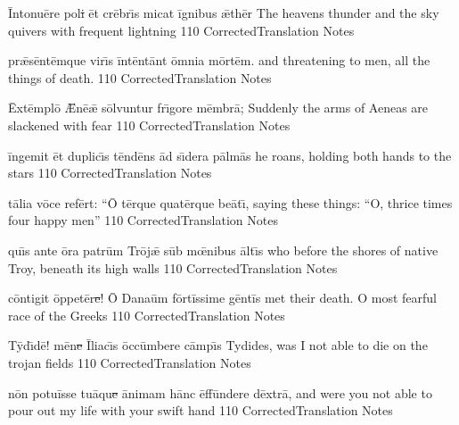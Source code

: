 \documentclass[]{book}
\begin{document}
	\latline
	  {\=Int\-on\-u\={\macron e}r\-e p\-ol\sout{i }\=et cr\={\macron e}br\={\macron \i}s m\-ic\-at \=ign\-ib\-us \={\ae}th\={\macron e}r}
	  { The heavens thunder and the sky quivers with frequent lightning }
	  {110}
	  { CorrectedTranslation }
	  { Notes }


	\latline
	  {pr\={\ae}s\=ent\=emqu\-e v\-ir\={\macron \i}s \=int\=ent\=ant \=omn\-i\-a m\=ort\=em.}
	  { and threatening to men, all the things of death. }
	  {110}
	  { CorrectedTranslation }
	  { Notes }


	\newpage

	\latline
	  {\=Ext\=empl\={\macron o} \={\AE}n\={\macron e}\={\ae} s\=olv\-unt\-ur fr\={\macron \i}g\-or\-e m\=embr\=a;}
	  { Suddenly the arms of Aeneas are slackened with fear }
	  {110}
	  { CorrectedTranslation }
	  { Notes }


	\latline
	  {\=ing\-em\-it \=et d\-upl\-ic\={\macron \i}s t\=end\={\macron e}ns \=ad s\={\macron \i}d\-er\-a p\=alm\={\macron a}s}
	  { he roans, holding both hands to the stars }
	  {110}
	  { CorrectedTranslation }
	  { Notes }


	\latline
	  {t\={\macron a}l\-i\-a v\={\macron o}c\-e r\-ef\=ert:  ``\={\macron O} t\=erqu\-e \-quat\=erqu\-e b\-e\={\macron a}t\={\macron \i},}
	  { saying these things:  ``O, thrice times four happy men'' }
	  {110}
	  { CorrectedTranslation }
	  { Notes }


	\newpage

	\latline
	  {qu\={\macron \i}s \-ant\-e \={\macron o}r\-a p\-atr\=um Tr\=oj\={\ae} s\=ub m\={\oe}n\-ib\-us \=alt\={\macron \i}s}
	  { who before the shores of native Troy, beneath its high walls }
	  {110}
	  { CorrectedTranslation }
	  { Notes }


	\latline
	  {c\=ont\-ig\-it \=opp\-et\=er\sout{e}!  \={\macron O} D\-an\-a\=um f\=ort\=iss\-im\-e g\=ent\=is}
	  { met their death.  O most fearful race of the Greeks }
	  {110}
	  { CorrectedTranslation }
	  { Notes }


	\latline
	  {T\={\macron y}d\={\macron \i}d\={\macron e}!  m\={\macron e}n\sout{e }\={\macron I}l\-i\-ac\={\macron \i}s \=occ\=umb\-er\-e c\=amp\={\macron \i}s}
	  { Tydides, was I not able to die on the trojan fields }
	  {110}
	  { CorrectedTranslation }
	  { Notes }


	\newpage

	\latline
	  {n\={\macron o}n p\-ot\-u\=iss\-e t\-u\={\macron a}qu\sout{e }\=an\-im\-am h\=anc \=eff\=und\-er\-e d\=extr\={\macron a},}
	  { and were you not able to pour out my life with your swift hand }
	  {110}
	  { CorrectedTranslation }
	  { Notes }
\end{document}
